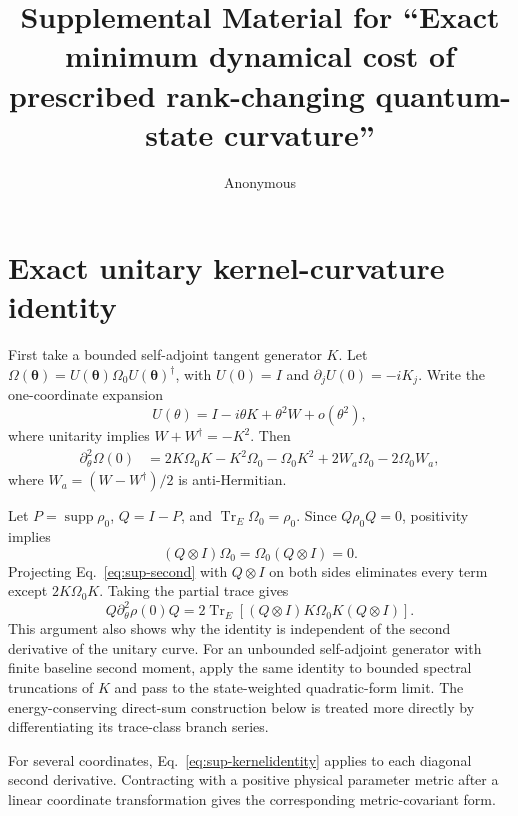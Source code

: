 \documentclass[aps,pra,preprint,nofootinbib]{revtex4-2}
\newcommand{\Tr}{\operatorname{Tr}}
\newcommand{\supp}{\operatorname{supp}}
\newcommand{\rhozero}{\rho_0}
\newcommand{\Omegazero}{\Omega_0}
\begin{document}
\title{Supplemental Material for ``Exact minimum dynamical cost of prescribed rank-changing quantum-state curvature''}
\author{Anonymous}
\maketitle

\section{Exact unitary kernel-curvature identity}

First take a bounded self-adjoint tangent generator $K$. Let $\Omega(\bm\theta)=U(\bm\theta)\Omegazero U(\bm\theta)^\dagger$, with $U(0)=I$ and $\partial_jU(0)=-iK_j$. Write the one-coordinate expansion
\begin{equation}
 U(\theta)=I-i\theta K+\theta^2 W+o(\theta^2),
\end{equation}
where unitarity implies $W+W^\dagger=-K^2$. Then
\begin{align}
 \partial_\theta^2\Omega(0)
 &=2K\Omegazero K-K^2\Omegazero-\Omegazero K^2
 +2W_a\Omegazero-2\Omegazero W_a,
 \label{eq:sup-second}
\end{align}
where $W_a=(W-W^\dagger)/2$ is anti-Hermitian.

Let $P=\supp\rhozero$, $Q=I-P$, and $\Tr_E\Omegazero=\rhozero$. Since $Q\rhozero Q=0$, positivity implies
\begin{equation}
 (Q\otimes I)\Omegazero=\Omegazero(Q\otimes I)=0.
 \label{eq:sup-support}
\end{equation}
Projecting Eq.~\eqref{eq:sup-second} with $Q\otimes I$ on both sides eliminates every term except $2K\Omegazero K$. Taking the partial trace gives
\begin{equation}
 Q\partial_\theta^2\rho(0)Q
 =2\Tr_E[(Q\otimes I)K\Omegazero K(Q\otimes I)].
 \label{eq:sup-kernelidentity}
\end{equation}
This argument also shows why the identity is independent of the second derivative of the unitary curve. For an unbounded self-adjoint generator with finite baseline second moment, apply the same identity to bounded spectral truncations of $K$ and pass to the state-weighted quadratic-form limit. The energy-conserving direct-sum construction below is treated more directly by differentiating its trace-class branch series.

For several coordinates, Eq.~\eqref{eq:sup-kernelidentity} applies to each diagonal second derivative. Contracting with a positive physical parameter metric after a linear coordinate transformation gives the corresponding metric-covariant form.
\end{document}
